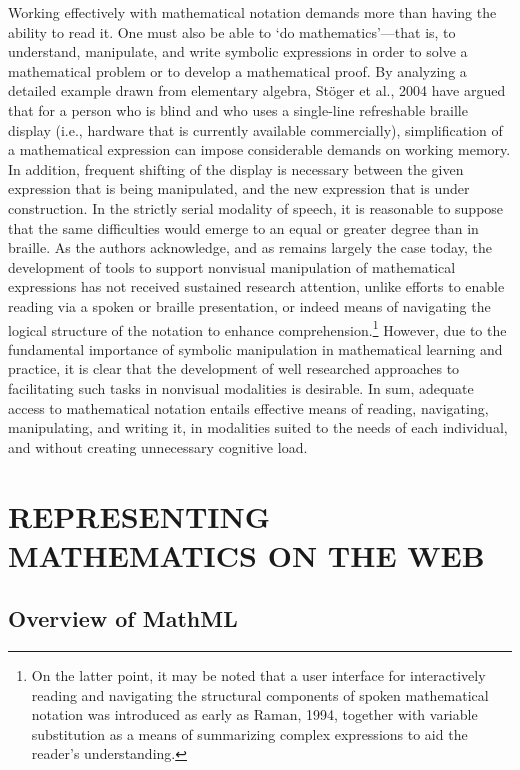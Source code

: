 \documentclass[11.5pt]{sig-alternate} %
\begin{document}
\begin{large}
Working effectively with mathematical notation demands more than having the ability to read it. One must also be able to ‘do mathematics’—that is, to understand, manipulate, and write symbolic expressions in order to solve a mathematical problem or to develop a mathematical proof. By analyzing a detailed example drawn from elementary algebra, Stöger et al., 2004 have argued that for a person who is blind and who uses a single-line refreshable braille display (i.e., hardware that is currently available commercially), simplification of a mathematical expression can impose considerable demands on working memory. In addition, frequent shifting of the display is necessary between the given expression that is being manipulated, and the new expression that is under construction. In the strictly serial modality of speech, it is reasonable to suppose that the same difficulties would emerge to an equal or greater degree than in braille. As the authors acknowledge, and as remains largely the case today, the development of tools to support nonvisual manipulation of mathematical expressions has not received sustained research attention, unlike efforts to enable reading via a spoken or braille presentation, or indeed means of navigating the logical structure of the notation to enhance comprehension.\footnote{On the latter point, it may be noted that a user interface for interactively reading and navigating the structural components of spoken mathematical notation was introduced as early as Raman, 1994, together with variable substitution as a means of summarizing complex expressions to aid the reader’s understanding.} However, due to the fundamental importance of symbolic manipulation in mathematical learning and practice, it is clear that the development of well researched approaches to facilitating such tasks in nonvisual modalities is desirable. In sum, adequate access to mathematical notation entails effective means of reading, navigating, manipulating, and writing it, in modalities suited to the needs of each individual, and without creating unnecessary cognitive load.

\section*{REPRESENTING MATHEMATICS ON THE WEB}

\subsection*{Overview of MathML}


\end{large}
\end{document}
